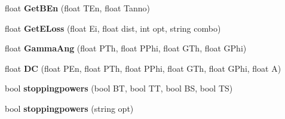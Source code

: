 \begin{DoxyCompactItemize}
\item 
\mbox{\label{classdoppler_a182d987ddc6db4a8b8e7f7821bda3846}} 
float {\bfseries Get\+B\+En} (float T\+En, float Tanno)
\item 
\mbox{\label{classdoppler_a64570ec784dabd6e17cf836489450527}} 
float {\bfseries Get\+E\+Loss} (float Ei, float dist, int opt, string combo)
\item 
\mbox{\label{classdoppler_a6dca381f91f2267abefadd62cf66f69f}} 
float {\bfseries Gamma\+Ang} (float P\+Th, float P\+Phi, float G\+Th, float G\+Phi)
\item 
\mbox{\label{classdoppler_a7f08d93d2bfa269f8c22ac71b604b09a}} 
float {\bfseries DC} (float P\+En, float P\+Th, float P\+Phi, float G\+Th, float G\+Phi, float A)
\item 
\mbox{\label{classdoppler_af3fe2bbd813b2c84fc79b156879205fd}} 
bool {\bfseries stoppingpowers} (bool BT, bool TT, bool BS, bool TS)
\item 
\mbox{\label{classdoppler_a4be762591578e28f8e9d646475ca943a}} 
bool {\bfseries stoppingpowers} (string opt)
\end{DoxyCompactItemize}

